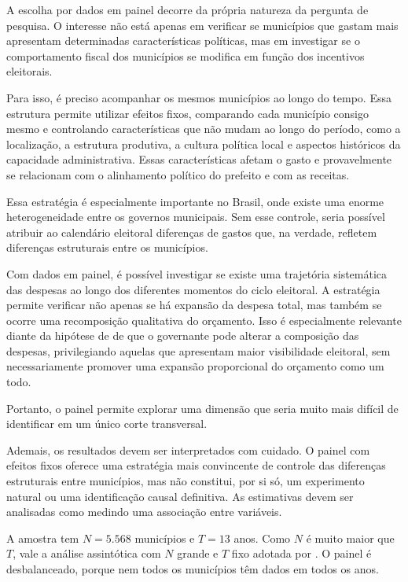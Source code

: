A escolha por dados em painel decorre da própria natureza da pergunta de pesquisa. O interesse não está apenas em verificar se municípios que gastam mais apresentam determinadas características políticas, mas em investigar se o comportamento fiscal dos municípios se modifica em função dos incentivos eleitorais.

Para isso, é preciso acompanhar os mesmos municípios ao longo do tempo. Essa estrutura permite utilizar efeitos fixos, comparando cada município consigo mesmo e controlando características que não mudam ao longo do período, como a localização, a estrutura produtiva, a cultura política local e aspectos históricos da capacidade administrativa. Essas características afetam o gasto e provavelmente se relacionam com o alinhamento político do prefeito e com as receitas.

Essa estratégia é especialmente importante no Brasil, onde existe uma enorme heterogeneidade entre os governos municipais. Sem esse controle, seria possível atribuir ao calendário eleitoral diferenças de gastos que, na verdade, refletem diferenças estruturais entre os municípios.

Com dados em painel, é possível investigar se existe uma trajetória sistemática das despesas ao longo dos diferentes momentos do ciclo eleitoral. A estratégia permite verificar não apenas se há expansão da despesa total, mas também se ocorre uma recomposição qualitativa do orçamento. Isso é especialmente relevante diante da hipótese de \textcite{drazen2010} de que o governante pode alterar a composição das despesas, privilegiando aquelas que apresentam maior visibilidade eleitoral, sem necessariamente promover uma expansão proporcional do orçamento como um todo.

Portanto, o painel permite explorar uma dimensão que seria muito mais difícil de identificar em um único corte transversal.

Ademais, os resultados devem ser interpretados com cuidado. O painel com efeitos fixos oferece uma estratégia mais convincente de controle das diferenças estruturais entre municípios, mas não constitui, por si só, um experimento natural ou uma identificação causal definitiva. As estimativas devem ser analisadas como medindo uma associação entre variáveis.

A amostra tem $N = 5.568$ municípios e $T = 13$ anos. Como $N$ é muito maior que $T$, vale a análise assintótica com $N$ grande e $T$ fixo adotada por \textcite[p.~250--251]{wooldridge2002}. O painel é desbalanceado, porque nem todos os municípios têm dados em todos os anos.

